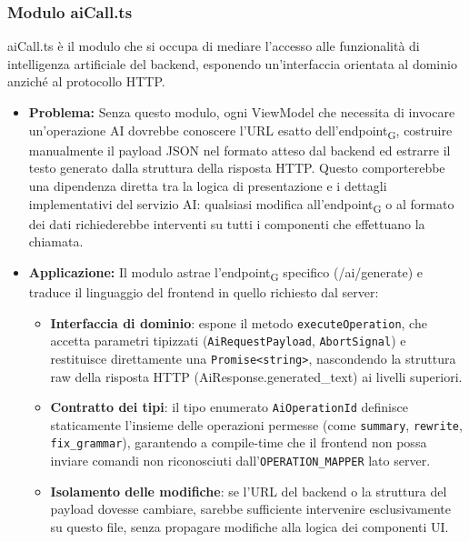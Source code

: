 \documentclass[11pt,a4paper]{article}
\newcommand{\gls}[1]{#1\textsubscript{G}}
\begin{document}
\subsubsection{Modulo aiCall.ts}
aiCall.ts è il modulo che si occupa di mediare l'accesso alle funzionalità di intelligenza artificiale del backend, esponendo un'interfaccia orientata al dominio anziché al protocollo HTTP.
\begin{itemize}
    \item \textbf{Problema:} Senza questo modulo, ogni ViewModel che necessita di invocare un'operazione AI dovrebbe conoscere l'URL esatto dell'\gls{endpoint}, costruire manualmente il payload JSON nel formato atteso dal backend ed estrarre il testo generato dalla struttura della risposta HTTP. Questo comporterebbe una dipendenza diretta tra la logica di presentazione e i dettagli implementativi del servizio AI: qualsiasi modifica all'\gls{endpoint} o al formato dei dati richiederebbe interventi su tutti i componenti che effettuano la chiamata.
    
    \item \textbf{Applicazione:} Il modulo astrae l'\gls{endpoint} specifico (/ai/generate) e traduce il linguaggio del frontend in quello richiesto dal server:
    \begin{itemize}
        \item \textbf{Interfaccia di dominio}: espone il metodo \texttt{executeOperation}, che accetta parametri tipizzati (\texttt{AiRequestPayload}, \texttt{AbortSignal}) e restituisce direttamente una \texttt{Promise<string>}, nascondendo la struttura raw della risposta HTTP (AiResponse.generated\_text) ai livelli superiori.
        \item \textbf{Contratto dei tipi}: il tipo enumerato \texttt{AiOperationId} definisce staticamente l'insieme delle operazioni permesse (come \texttt{summary}, \texttt{rewrite}, \texttt{fix\_grammar}), garantendo a compile-time che il frontend non possa inviare comandi non riconosciuti dall'\texttt{OPERATION\_MAPPER} lato server.
        \item \textbf{Isolamento delle modifiche}: se l'URL del backend o la struttura del payload dovesse cambiare, sarebbe sufficiente intervenire esclusivamente su questo file, senza propagare modifiche alla logica dei componenti UI.
    \end{itemize}
\end{itemize}
\end{document}
